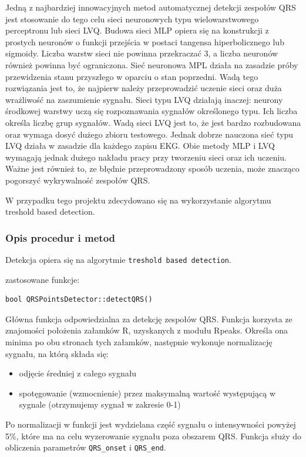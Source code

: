 \documentclass[a4paper, 11pt]{article}
\begin{document}
Jedną z najbardziej innowacyjnych metod automatycznej detekcji zespołów QRS
jest stosowanie do tego celu sieci neuronowych typu wielowarstwowego
perceptronu lub sieci LVQ. Budowa sieci MLP opiera się na konstrukcji z prostych neuronów o funkcji przejścia w postaci
tangensa hiperbolicznego lub sigmoidy. Liczba warstw sieci nie powinna
przekraczać 3, a liczba neuronów również powinna być ograniczona. 
Sieć neuronowa MPL działa na zasadzie próby przewidzenia stanu
przyszłego w oparciu o stan poprzedni. Wadą tego rozwiązania jest to, że najpierw należy przeprowadzić uczenie sieci oraz duża wrażliwość na zaszumienie sygnału.  Sieci typu LVQ działają inaczej: neurony środkowej warstwy uczą się rozpoznawania
sygnałów określonego typu. Ich liczba określa liczbę grup sygnałów.
Wadą sieci LVQ jest to, że jest bardzo rozbudowana oraz
wymaga dosyć dużego zbioru testowego. Jednak dobrze nauczona sieć typu LVQ działa w zasadzie dla każdego zapisu EKG.
Obie metody MLP i LVQ wymagają jednak
dużego nakładu pracy przy tworzeniu sieci oraz ich uczeniu. Ważne jest również to, ze błędnie przeprowadzony sposób uczenia, może znacząco pogorszyć wykrywalność zespołów QRS.

W przypadku tego projektu zdecydowano się na wykorzystanie algorytmu treshold based detection.


\subsubsection{Opis procedur i metod}
\label{sec:st_interval:procs}
Detekcja opiera się na algorytmie \verb|treshold based detection|.


zastosowane funkcje:


\begin{lstlisting}
bool QRSPointsDetector::detectQRS()
\end{lstlisting}
Główna funkcja odpowiedzialna za detekcję zespołów QRS. Funkcja korzysta ze znajomości położenia
załamków R, uzyskanych z modułu Rpeaks. Określa ona minima po obu stronach tych załamków,
następnie wykonuje normalizację sygnału, na którą składa się:
\begin{itemize}
     \item odjęcie średniej z całego sygnału
     \item spotęgowanie (wzmocnienie)
     \itempodzielenie przez maksymalną wartość występującą w sygnale (otrzymujemy sygnał
w zakresie 0-1)
\end{itemize}

Po normalizacji w funkcji jest wydzielana część sygnału o intensywności powyżej 5\%, które ma na
celu wyzerowanie sygnału poza obszarem QRS. Funkcja służy do obliczenia parametrów \verb|QRS_onset| i
\verb|QRS_end|.
\end{document}
